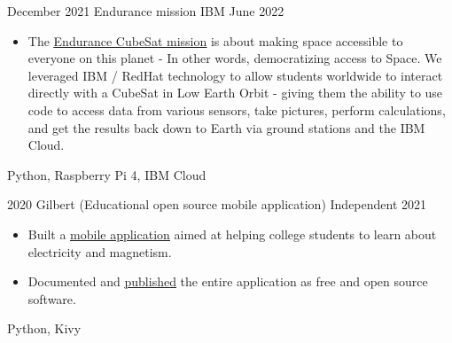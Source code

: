 %
%
%


\begin{projects}

    \project
        {December 2021}
        {Endurance mission}
        {IBM}
        {June 2022}
        {
            \begin{itemize}
                \item The \href{https://endurancein.space/}{\underline{Endurance CubeSat mission}} 
                      is about making space accessible to everyone on 
                      this planet - In other words, democratizing access 
                      to Space. We leveraged IBM / RedHat technology 
                      to allow students worldwide to interact 
                      directly with a CubeSat in Low Earth Orbit - giving 
                      them the ability to use code to access data from 
                      various sensors, take pictures, perform calculations, 
                      and get the results back down to Earth via ground 
                      stations and the IBM Cloud.
            \end{itemize}
        }
        {
            Python,
            Raspberry Pi 4,
            IBM Cloud
        }
    \emptySeparator

    \project
        {2020}
        {Gilbert (Educational open source mobile application)}
        {Independent}
        {2021}
        {
            \begin{itemize}
                \item Built a \href{https://play.google.com/store/apps/details?id=net.kippel.gilbert}{\underline{mobile application}}
                    aimed at helping college students to learn about electricity
                    and magnetism.
                \item Documented and
                    \href{https://github.com/alanverdugo/gilbert}
                    {\underline{published}} the entire application as free and open
                    source software.
            \end{itemize}
        }
        {
            Python,
            Kivy
        }
    \emptySeparator


\end{projects}

